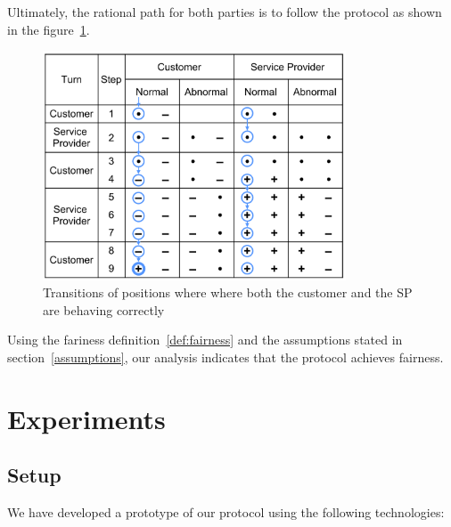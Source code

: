 \documentclass{ieeeaccess}
\begin{document}
Ultimately, the rational path for both parties is to follow the protocol as shown in the figure~\ref{fig:rational}.

\begin{figure}[h!]
\includegraphics[width=9cm]{formal-rational-path.png}
\centering
\caption{Transitions of positions where where both the customer and the SP are behaving correctly}
\label{fig:rational}
\end{figure}

Using the fariness definition~\ref{def:fairness} and the assumptions stated in section~\ref{assumptions}, our analysis indicates that the protocol achieves fairness.

\section{Experiments}\label{sec:experiments}

\subsection*{Setup}

We have developed a prototype of our protocol using the following technologies:
\end{document}
